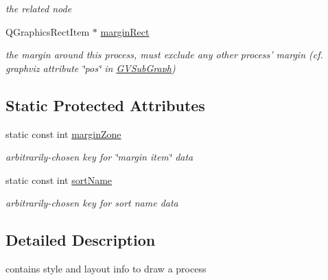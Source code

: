 \begin{DoxyCompactItemize}
\begin{DoxyCompactList}\small\item\em the related node \end{DoxyCompactList}\item 
\hypertarget{class_g_process_a9488cf1e4bf4351233aaaa1c1bc67370}{\-Q\-Graphics\-Rect\-Item $\ast$ \hyperlink{class_g_process_a9488cf1e4bf4351233aaaa1c1bc67370}{margin\-Rect}}\label{class_g_process_a9488cf1e4bf4351233aaaa1c1bc67370}

\begin{DoxyCompactList}\small\item\em the margin around this process, must exclude any other process' margin (cf. graphviz attribute \char`\"{}pos\char`\"{} in \hyperlink{class_g_v_sub_graph}{\-G\-V\-Sub\-Graph}) \end{DoxyCompactList}\end{DoxyCompactItemize}
\subsection*{\-Static \-Protected \-Attributes}
\begin{DoxyCompactItemize}
\item 
\hypertarget{class_g_process_a94d91ce9eef85fe8d4f97f7c3ab8ee98}{static const int \hyperlink{class_g_process_a94d91ce9eef85fe8d4f97f7c3ab8ee98}{margin\-Zone}}\label{class_g_process_a94d91ce9eef85fe8d4f97f7c3ab8ee98}

\begin{DoxyCompactList}\small\item\em arbitrarily-\/chosen key for \char`\"{}margin item\char`\"{} data \end{DoxyCompactList}\item 
\hypertarget{class_g_process_a8dd5428c10ff4d7317b244630aa13012}{static const int \hyperlink{class_g_process_a8dd5428c10ff4d7317b244630aa13012}{sort\-Name}}\label{class_g_process_a8dd5428c10ff4d7317b244630aa13012}

\begin{DoxyCompactList}\small\item\em arbitrarily-\/chosen key for sort name data \end{DoxyCompactList}\end{DoxyCompactItemize}


\subsection{\-Detailed \-Description}
contains style and layout info to draw a process 


